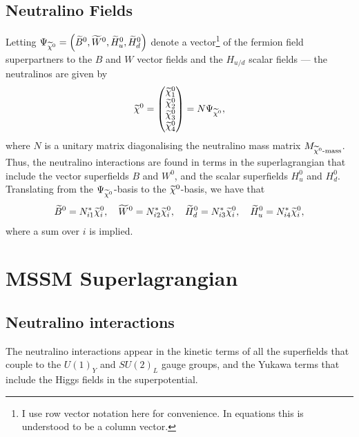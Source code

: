 \documentclass[english, notitlepage]{article}
\begin{document}
        \subsection{Neutralino Fields}
            Letting $\Psi_{\nino} = \pclosed{\bino, \wino, \hinou, \hinod}$ denote a vector\footnote{I use row vector notation here for convenience. In equations this is understood to be a column vector.} of the fermion field superpartners to the $B$ and $W$ vector fields and the $H_{u/d}$ scalar fields --- the neutralinos are given by
            \begin{align}
                \nino = \begin{pmatrix}
                    \nino[1] \\ \nino[2] \\ \nino[3] \\ \nino[4]
                \end{pmatrix} = N \Psi_{\nino},
            \end{align}
            where $N$ is a unitary matrix diagonalising the neutralino mass matrix $M_{\nino\text{-mass}}$. Thus, the neutralino interactions are found in terms in the superlagrangian that include the vector superfields $B$ and $W^0$, and the scalar superfields $H_u^0$ and $H_d^0$. Translating from the $\Psi_{\nino}$-basis to the $\nino$-basis, we have that
            \begin{align}
                \bino = N_{i1}^* \nino[i],\quad \wino = N_{i2}^* \nino[i],\quad \hinod = N_{i3}^* \nino[i],\quad \hinou = N_{i4}^* \nino[i],
            \end{align}
            where a sum over $i$ is implied.

    \section{MSSM Superlagrangian}

        \subsection{Neutralino interactions}
            The neutralino interactions appear in the kinetic terms of all the superfields that couple to the $U(1)_Y$ and $SU(2)_L$ gauge groups, and the Yukawa terms that include the Higgs fields in the superpotential.
\end{document}
